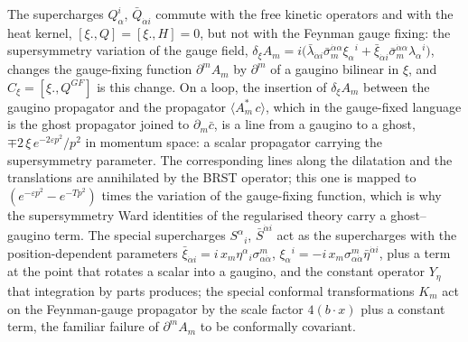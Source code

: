 \begin{remark}
The supercharges $Q^i_\alpha$, $\bar Q_{\dot\alpha i}$ commute with the free kinetic operators and with the heat kernel, $[\xi.,Q]=[\xi.,H]=0$, but not with the Feynman gauge fixing: the supersymmetry variation of the gauge field, $\delta_\xi A_m=i\big(\bar\lambda_{\dot\alpha i}\bar\sigma_m^{\dot\alpha\alpha}\xi_\alpha{}^i+\bar\xi_{\dot\alpha i}\bar\sigma_m^{\dot\alpha\alpha}\lambda_\alpha{}^i\big)$, changes the gauge-fixing function $\partial^mA_m$ by $\partial^m$ of a gaugino bilinear in $\xi$, and $C_\xi=[\xi.,Q^{GF}]$ is this change. On a loop, the insertion of $\delta_\xi A_m$ between the gaugino propagator and the propagator $\langle A^*_m\,c\rangle$, which in the gauge-fixed language is the ghost propagator joined to $\partial_m\bar c$, is a line from a gaugino to a ghost, $\mp2\,\xi\,e^{-2\varepsilon p^2}/p^2$ in momentum space: a scalar propagator carrying the supersymmetry parameter. The corresponding lines along the dilatation and the translations are annihilated by the BRST operator; this one is mapped to $(e^{-\varepsilon p^2}-e^{-Tp^2})$ times the variation of the gauge-fixing function, which is why the supersymmetry Ward identities of the regularised theory carry a ghost--gaugino term. The special supercharges $S^\alpha{}_i$, $\bar S^{\dot\alpha i}$ act as the supercharges with the position-dependent parameters $\bar\xi_{\dot\alpha i}=i\,x_m\eta^\alpha{}_i\sigma^m_{\alpha\dot\alpha}$, $\xi_\alpha{}^i=-i\,x_m\sigma^m_{\alpha\dot\alpha}\bar\eta^{\dot\alpha i}$, plus a term at the point that rotates a scalar into a gaugino, and the constant operator $Y_\eta$ that integration by parts produces; the special conformal transformations $K_m$ act on the Feynman-gauge propagator by the scale factor $4(b\cdot x)$ plus a constant term, the familiar failure of $\partial^mA_m$ to be conformally covariant.
\end{remark}

